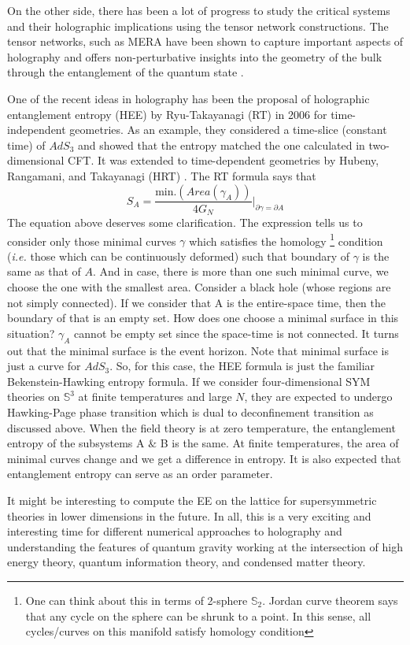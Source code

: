 On the other side, there has been a lot of progress to study the critical systems and their holographic
implications using the tensor network constructions. 
The tensor networks, such as MERA \cite{2008PhRvL.101k0501V} 
have been shown to capture important aspects of holography and offers non-perturbative insights into the geometry of the bulk through the entanglement of the quantum state \cite{Swingle:2009bg, 2015PhRvL.115t0401E, 2011JSP...145..891E, 
2018RvMP...90c5007N, VanRaamsdonk:2009ar, Headrick:2018ctr}.

One of the recent ideas in holography has been the proposal of holographic entanglement entropy (HEE) 
by Ryu-Takayanagi (RT) in 2006 for time-independent geometries. As an example, they considered a time-slice (constant time) 
of $AdS_{3}$ and showed that the entropy matched the one calculated in two-dimensional CFT. 
It was extended to time-dependent geometries by Hubeny, Rangamani, and Takayanagi (HRT) \cite{2007JHEP...07..062H}.
The RT formula says that \begin{equation}
S_{A} = \frac{\text{min.}(Area(\gamma_{A}))}{4G_{N}} \Bigg \vert_{\partial \gamma = \partial A} 
\end{equation} 
The equation above deserves some clarification. The expression tells us to consider only those minimal curves $\gamma$ which satisfies
the homology \footnote{One can think about this in terms of 2-sphere $\mathbb{S}_{2}$. Jordan curve theorem says that any cycle on the sphere can be shrunk to a point. In this sense, all cycles/curves on this manifold satisfy homology condition} condition (\emph{i.e.} those which can be continuously deformed) such that boundary of $\gamma$ is the same as that of $A$. And in case, there is more than one such minimal curve, we choose the one with the smallest area. 
Consider a black hole (whose regions are not simply connected). If we consider that A is the entire-space time, then the boundary of that is an empty set. How does one choose a minimal surface in this situation? $\gamma_{A}$ cannot be empty set since the space-time is not connected. It turns out that the minimal surface is the event horizon. Note that minimal surface is just a curve for $AdS_{3}$.
So, for this case, the HEE formula is just the familiar Bekenstein-Hawking entropy formula. 
If we consider four-dimensional SYM theories on $\mathbb{S}^{3}$ 
at finite temperatures and large $N$, they are expected to undergo Hawking-Page phase transition which is dual to deconfinement transition as discussed above. When the field theory is at zero temperature, the entanglement entropy of the subsystems A $\&$ B is the same. At finite temperatures, the area of minimal curves change and we get a difference in entropy. It is also expected that entanglement entropy can serve as an order parameter. 

It might be interesting to compute the EE on the lattice for supersymmetric theories
in lower dimensions in the future. In all, this is a very exciting and interesting time for different numerical approaches to holography and understanding the features of quantum gravity working at the intersection of high energy theory, quantum information theory, and condensed matter theory.